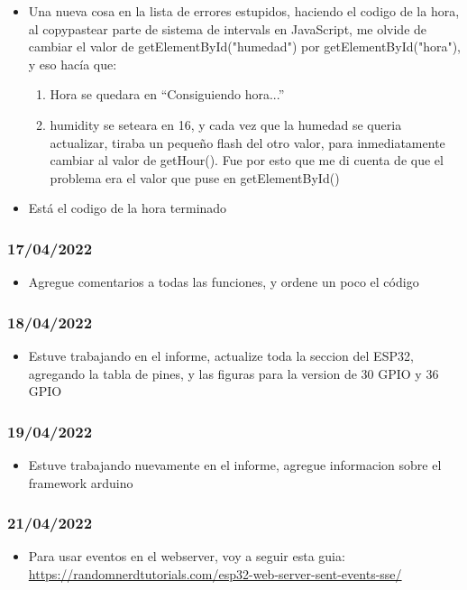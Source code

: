 \documentclass[../informe_krapp.tex]{subfiles}
\begin{document}
\begin{itemize}
	\item Una nueva cosa en la lista de errores estupidos, haciendo el codigo de la hora,
	      al copypastear parte de sistema de intervals en JavaScript, me olvide de cambiar el valor de getElementById("humedad") por getElementById("hora"), y eso
	      hacía que:
	      \begin{enumerate}
		      \item Hora se quedara en ``Consiguiendo hora...''
		      \item humidity se seteara en 16, y cada vez que la humedad se queria actualizar,
		            tiraba un pequeño flash del otro valor, para inmediatamente cambiar
		            al valor de getHour(). Fue por esto que me di cuenta de que el
		            problema era el valor que puse en getElementById()
	      \end{enumerate}
	\item Está el codigo de la hora terminado
\end{itemize}

\subsubsection{17/04/2022}
\begin{itemize}
	\item Agregue comentarios a todas las funciones, y ordene un poco el código
\end{itemize}

\subsubsection{18/04/2022}
\begin{itemize}
	\item Estuve trabajando en el informe, actualize toda la seccion del ESP32, agregando
	      la tabla de pines, y las figuras para la version de 30 GPIO y 36 GPIO
\end{itemize}

\subsubsection{19/04/2022}
\begin{itemize}
	\item Estuve trabajando nuevamente en el informe, agregue informacion sobre el framework
	      arduino
\end{itemize}

\subsubsection{21/04/2022}
\begin{itemize}
	\item Para usar eventos en el webserver, voy a seguir esta guia:
	      \url{https://randomnerdtutorials.com/esp32-web-server-sent-events-sse/}
\end{itemize}
\end{document}

